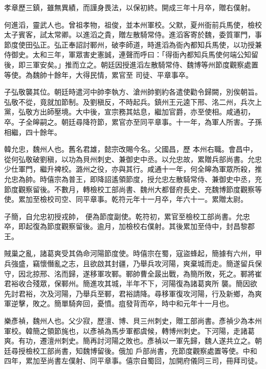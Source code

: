 \begin{pinyinscope}
 孝章歷三鎮，雖無異績，而謹身畏法，以保初終。開成三年十月卒，贈右僕射。



 何進滔，靈武人也。曾祖孝物，祖俊，並本州軍校。父默，夏州衙前兵馬使，檢校太子賓客，試太常卿。以進滔之貴，贈左散騎常侍。進滔客寄於魏，委質軍門，事節度使田弘正。弘正奉詔討鄆州，破李師道，時進滔為衙內都知兵馬使，以功授兼侍御史。太和三年，軍眾害史憲誠，連聲而呼曰：「得衙內都知兵馬使何端公知留後，即三軍安矣。」推而立之。朝廷因授進滔左散騎常侍、魏博等州節度觀察處置等使。為魏帥十餘年，大得民情，累官至
 司徒、平章事卒。



 子弘敬襲其位。朝廷時遣河中帥李執方、滄州帥劉約各遣使勸令歸闕，別俟朝旨。弘敬不從，竟就加節制。及劉稹反，不時起兵。鎮州王元逵下邢、洺二州，兵次上黨，弘敬方出師壓境。大中後，宣宗務其姑息，繼加官爵，亦至使相。咸通初，卒。子全皞嗣之。朝廷尋降符節，累官亦至同平章事。十一年，為軍人所害。子孫相繼，四十餘年。



 韓允忠，魏州人也。舊名君雄，懿宗改賜今名。父國昌，歷
 本州右職。會昌中，從何弘敬破劉稹，以功為貝州刺史、兼御史中丞。以允忠故，累贈兵部尚書。允忠少仕軍門，繼升裨校。潞州之役，亦與其行。咸通十一年，何全皞為軍眾所殺，推允忠為帥。時僖宗為普王，即降詔遙領節度，授允忠左散騎常侍、兼御史中丞，充節度觀察留後。不數月，轉檢校工部尚書、魏州大都督府長史、充魏博節度觀察等使。累加至檢校司空、同平章事。乾符元年十一月卒，年六十一。累贈太尉。



 子簡，自允忠初授戎帥，
 便為節度副使。乾符初，累官至檢校工部尚書。允忠卒，即起復為節度觀察留後。逾月，加檢校右僕射。其後累加至侍中，封昌黎郡王。



 賊巢之亂，諸葛爽受其偽命河陽節度使。時僖宗在蜀，寇盜蜂起，簡據有六州，甲兵強盛，竊懷僭亂之志，且欲啟其封疆，乃舉兵攻河陽，爽棄城而走。簡遂留兵保守，因北掠邢、洺而歸，遂移軍攻鄆。鄆帥曹全晸出戰，為簡所敗，死之。鄆將崔君裕收合殘眾，保鄆州。簡進攻其城，半年不下，河陽復為諸葛爽所
 襲。簡因欲先討君裕，次及河陽，乃舉兵至鄆，君裕請降。尋移軍復攻河陽，行及新鄉，為爽軍逆擊，敗之。簡單騎奔回，憂憤。疽發背而卒，時中和元年十一月也。



 樂彥禎，魏州人也。父少寂，歷澶、博、貝三州刺史，贈工部尚書。彥禎少為本州軍校。韓簡之領節旄也，以彥禎為馬步軍都虞候，轉博州刺史。下河陽，走諸葛爽。有功，遷澶州刺史。簡再討河陽之敗也。彥禎以一軍先歸，魏人遂共立之。朝廷尋授檢校工部尚書，知魏博留後。俄加
 戶部尚書，充節度觀察處置等使。中和四年，累加至尚書左僕射、同平章事。僖宗自蜀回，加開府儀同三司，冊拜司徒。




\end{pinyinscope}
